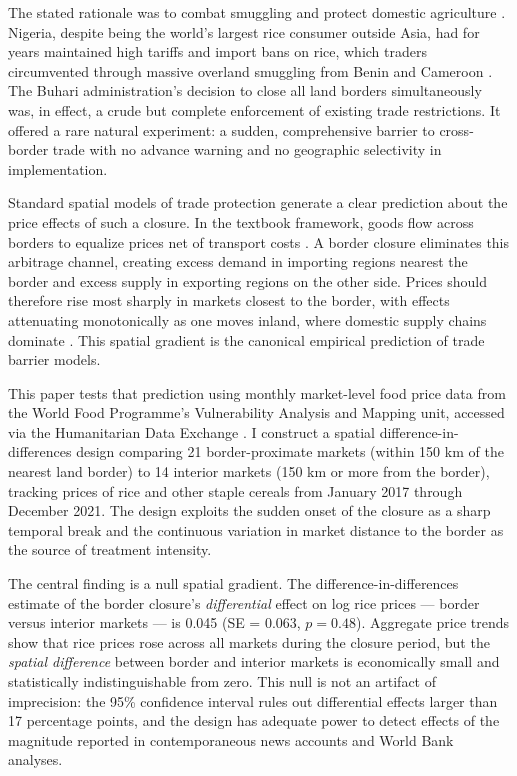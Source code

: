 \documentclass[12pt]{article}
\begin{document}
The stated rationale was to combat smuggling and protect domestic agriculture \citep{okonjo2020nigeria}. Nigeria, despite being the world's largest rice consumer outside Asia, had for years maintained high tariffs and import bans on rice, which traders circumvented through massive overland smuggling from Benin and Cameroon \citep{calvo2019nigeria}. The Buhari administration's decision to close all land borders simultaneously was, in effect, a crude but complete enforcement of existing trade restrictions. It offered a rare natural experiment: a sudden, comprehensive barrier to cross-border trade with no advance warning and no geographic selectivity in implementation.

Standard spatial models of trade protection generate a clear prediction about the price effects of such a closure. In the textbook framework, goods flow across borders to equalize prices net of transport costs \citep{krugman1991geography, fackler2001spatial}. A border closure eliminates this arbitrage channel, creating excess demand in importing regions nearest the border and excess supply in exporting regions on the other side. Prices should therefore rise most sharply in markets closest to the border, with effects attenuating monotonically as one moves inland, where domestic supply chains dominate \citep{allen2014trade}. This spatial gradient is the canonical empirical prediction of trade barrier models.

This paper tests that prediction using monthly market-level food price data from the World Food Programme's Vulnerability Analysis and Mapping unit, accessed via the Humanitarian Data Exchange \citep{wfp2020nigeria}. I construct a spatial difference-in-differences design comparing 21 border-proximate markets (within 150 km of the nearest land border) to 14 interior markets (150 km or more from the border), tracking prices of rice and other staple cereals from January 2017 through December 2021. The design exploits the sudden onset of the closure as a sharp temporal break and the continuous variation in market distance to the border as the source of treatment intensity.

The central finding is a null spatial gradient. The difference-in-differences estimate of the border closure's \emph{differential} effect on log rice prices --- border versus interior markets --- is 0.045 (SE = 0.063, $p = 0.48$). Aggregate price trends show that rice prices rose across all markets during the closure period, but the \emph{spatial difference} between border and interior markets is economically small and statistically indistinguishable from zero. This null is not an artifact of imprecision: the 95\% confidence interval rules out differential effects larger than 17 percentage points, and the design has adequate power to detect effects of the magnitude reported in contemporaneous news accounts and World Bank analyses.
\end{document}

